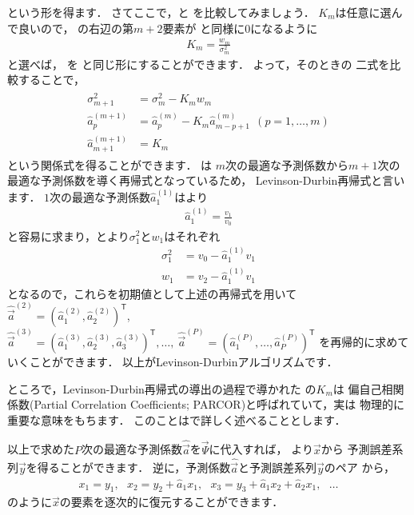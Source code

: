 という形を得ます．
さてここで，と
を比較してみましょう．
$K_m$は任意に選んで良いので，
の右辺の第$m+2$要素が
と同様に0になるように
\begin{align}
K_m = \frac{w_m}{\sigma_m^2}
\label{eq:PARCOR}
\end{align}
と選べば，
を
と同じ形にすることができます．
よって，そのときの
二式を比較することで，
\begin{align}
\begin{split}
\sigma_{m+1}^2 &= \sigma_m^2 - K_m w_m\\
\hat{a}_p^{(m+1)} &= \hat{a}_p^{(m)} - K_m \hat{a}_{m-p+1}^{(m)}~~(p=1,\ldots,m)\\
\hat{a}_{m+1}^{(m+1)} &= K_m
\end{split}
\label{eq:LevinsonDurbinRecursion}
\end{align}
という関係式を得ることができます．
は
$m$次の最適な予測係数から$m+1$次の最適な予測係数を導く再帰式となっているため，
Levinson-Durbin再帰式と言います．
$1$次の最適な予測係数$\hat{a}_1^{(1)}$はより
\begin{align}
\hat{a}_1^{(1)} = \frac{v_1}{v_0}
\end{align}
と容易に求まり，とより$\sigma_1^2$と$w_1$はそれぞれ
\begin{align}
\sigma_1^2 &=
v_0 - \hat{a}_1^{(1)} v_1
\\
w_1 &= v_2 - \hat{a}_1^{(1)} v_1
\end{align}
となるので，これらを初期値として上述の再帰式を用いて
$\hat{\Vec{a}}^{(2)} = (\hat{a}_{1}^{(2)},\hat{a}_2^{(2)})^{\mathsf T}$, 
$\hat{\Vec{a}}^{(3)} = (\hat{a}_{1}^{(3)},\hat{a}_2^{(3)},\hat{a}_{3}^{(3)})^{\mathsf T},
\ldots,~\hat{\Vec{a}}^{(P)} = (\hat{a}_{1}^{(P)},\ldots,\hat{a}_{P}^{(P)})^{\mathsf T}$
を再帰的に求めていくことができます．
以上がLevinson-Durbinアルゴリズムです．

ところで，Levinson-Durbin再帰式の導出の過程で導かれた
の$K_m$は
偏自己相関係数(Partial Correlation Coefficients; PARCOR)と呼ばれていて，実は
物理的に重要な意味をもちます．
このことはで詳しく述べることとします．

以上で求めた$P$次の最適な予測係数$\hat{\Vec{a}}$を$\Vec{\Psi}$に代入すれば，
より$\Vec{x}$から
予測誤差系列$\Vec{y}$を得ることができます．
逆に，予測係数$\hat{\Vec{a}}$と予測誤差系列$\Vec{y}$のペア
から，
\begin{align}
x_1 = y_1,~~~
x_2 = y_2 + \hat{a}_1 x_1,~~~
x_3 = y_3 + \hat{a}_1 x_2 + \hat{a}_2 x_1,~~~
\ldots
\end{align}
のように$\Vec{x}$の要素を逐次的に復元することができます．


